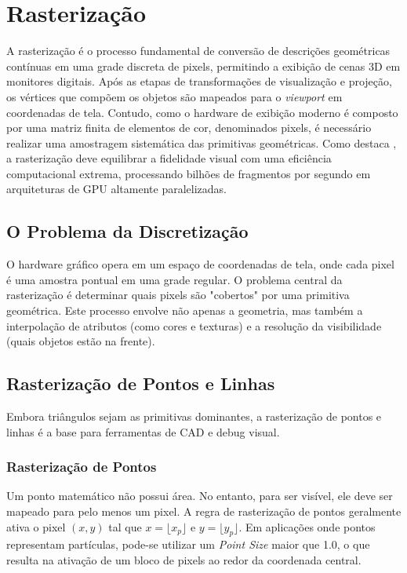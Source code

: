 \chapter{Rasterização}

A rasterização é o processo fundamental de conversão de descrições geométricas contínuas em uma grade discreta de pixels, permitindo a exibição de cenas 3D em monitores digitais. Após as etapas de transformações de visualização e projeção, os vértices que compõem os objetos são mapeados para o \textit{viewport} em coordenadas de tela. Contudo, como o hardware de exibição moderno é composto por uma matriz finita de elementos de cor, denominados pixels, é necessário realizar uma amostragem sistemática das primitivas geométricas. Como destaca \textcite{shirley2021fundamentals}, a rasterização deve equilibrar a fidelidade visual com uma eficiência computacional extrema, processando bilhões de fragmentos por segundo em arquiteturas de GPU altamente paralelizadas.

\section{O Problema da Discretização}

O hardware gráfico opera em um espaço de coordenadas de tela, onde cada pixel é uma amostra pontual em uma grade regular. O problema central da rasterização é determinar quais pixels são "cobertos" por uma primitiva geométrica. Este processo envolve não apenas a geometria, mas também a interpolação de atributos (como cores e texturas) e a resolução da visibilidade (quais objetos estão na frente).

\section{Rasterização de Pontos e Linhas}

Embora triângulos sejam as primitivas dominantes, a rasterização de pontos e linhas é a base para ferramentas de CAD e debug visual.

\subsection{Rasterização de Pontos}

Um ponto matemático não possui área. No entanto, para ser visível, ele deve ser mapeado para pelo menos um pixel. A regra de rasterização de pontos geralmente ativa o pixel $(x, y)$ tal que $x = \lfloor x_p \rfloor$ e $y = \lfloor y_p \rfloor$. Em aplicações onde pontos representam partículas, pode-se utilizar um \textit{Point Size} maior que 1.0, o que resulta na ativação de um bloco de pixels ao redor da coordenada central.

